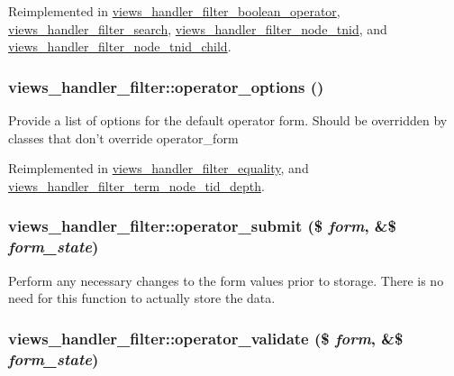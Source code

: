 Reimplemented in \hyperlink{classviews__handler__filter__boolean__operator_2b8c0523843b8f24144bf5a59254cdd9}{views\_\-handler\_\-filter\_\-boolean\_\-operator}, \hyperlink{classviews__handler__filter__search_126abdcf04c59fd3e4be404ffd9969cf}{views\_\-handler\_\-filter\_\-search}, \hyperlink{classviews__handler__filter__node__tnid_92d26c1ecccc0a2985d4195a46c7e87b}{views\_\-handler\_\-filter\_\-node\_\-tnid}, and \hyperlink{classviews__handler__filter__node__tnid__child_e0cfa82e361de74d4f24f820f5106117}{views\_\-handler\_\-filter\_\-node\_\-tnid\_\-child}.\hypertarget{classviews__handler__filter_cbd69b92e9199530a54069c79368db7f}{
\subsubsection[{operator\_\-options}]{\setlength{\rightskip}{0pt plus 5cm}views\_\-handler\_\-filter::operator\_\-options ()}}
\label{classviews__handler__filter_cbd69b92e9199530a54069c79368db7f}


Provide a list of options for the default operator form. Should be overridden by classes that don't override operator\_\-form 

Reimplemented in \hyperlink{classviews__handler__filter__equality_65280b952e08acb863768f6316dbeb33}{views\_\-handler\_\-filter\_\-equality}, and \hyperlink{classviews__handler__filter__term__node__tid__depth_fb7fceb94e0b622039906c0d97d64f4d}{views\_\-handler\_\-filter\_\-term\_\-node\_\-tid\_\-depth}.\hypertarget{classviews__handler__filter_e9dbe89c9a8f6017492217c25d81ba53}{
\subsubsection[{operator\_\-submit}]{\setlength{\rightskip}{0pt plus 5cm}views\_\-handler\_\-filter::operator\_\-submit (\$ {\em form}, \/  \&\$ {\em form\_\-state})}}
\label{classviews__handler__filter_e9dbe89c9a8f6017492217c25d81ba53}


Perform any necessary changes to the form values prior to storage. There is no need for this function to actually store the data. \hypertarget{classviews__handler__filter_63a138e4e07e0537e2ece65bc7a9784e}{
\subsubsection[{operator\_\-validate}]{\setlength{\rightskip}{0pt plus 5cm}views\_\-handler\_\-filter::operator\_\-validate (\$ {\em form}, \/  \&\$ {\em form\_\-state})}}
\label{classviews__handler__filter_63a138e4e07e0537e2ece65bc7a9784e}


